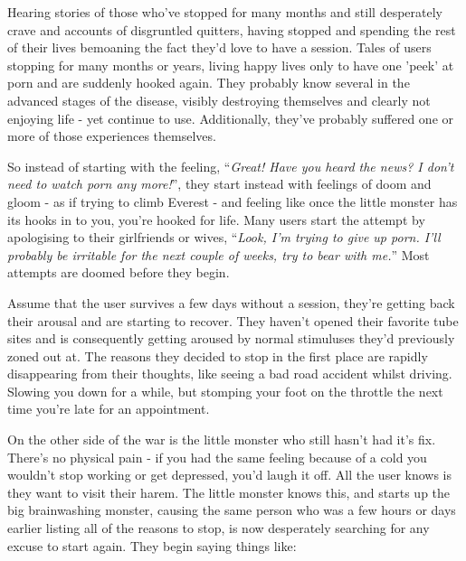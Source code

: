 \documentclass[
]{book}
\begin{document}
Hearing stories of those who've stopped for many months and still desperately crave and accounts of disgruntled quitters, having stopped and spending the rest of their lives bemoaning the fact they'd love to have a session. Tales of users stopping for many months or years, living happy lives only to have one 'peek' at porn and are suddenly hooked again. They probably know several in the advanced stages of the disease, visibly destroying themselves and clearly not enjoying life - yet continue to use. Additionally, they've probably suffered one or more of those experiences themselves.

So instead of starting with the feeling, ``\emph{Great! Have you heard the news? I don't need to watch porn any more!}'', they start instead with feelings of doom and gloom - as if trying to climb Everest - and feeling like once the little monster has its hooks in to you, you're hooked for life. Many users start the attempt by apologising to their girlfriends or wives, ``\emph{Look, I'm trying to give up porn. I'll probably be irritable for the next couple of weeks, try to bear with me.}'' Most attempts are doomed before they begin.

Assume that the user survives a few days without a session, they're getting back their arousal and are starting to recover. They haven't opened their favorite tube sites and is consequently getting aroused by normal stimuluses they'd previously zoned out at. The reasons they decided to stop in the first place are rapidly disappearing from their thoughts, like seeing a bad road accident whilst driving. Slowing you down for a while, but stomping your foot on the throttle the next time you're late for an appointment.

On the other side of the war is the little monster who still hasn't had it's fix. There's no physical pain - if you had the same feeling because of a cold you wouldn't stop working or get depressed, you'd laugh it off. All the user knows is they want to visit their harem. The little monster knows this, and starts up the big brainwashing monster, causing the same person who was a few hours or days earlier listing all of the reasons to stop, is now desperately searching for any excuse to start again. They begin saying things like:
\end{document}
